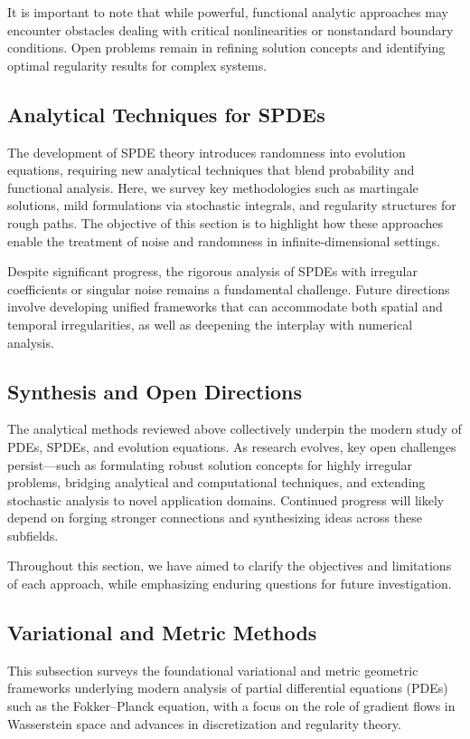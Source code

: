 \documentclass[sigconf]{acmart}
\begin{document}
It is important to note that while powerful, functional analytic approaches may encounter obstacles dealing with critical nonlinearities or nonstandard boundary conditions. Open problems remain in refining solution concepts and identifying optimal regularity results for complex systems.

\subsection{Analytical Techniques for SPDEs}
The development of SPDE theory introduces randomness into evolution equations, requiring new analytical techniques that blend probability and functional analysis. Here, we survey key methodologies such as martingale solutions, mild formulations via stochastic integrals, and regularity structures for rough paths. The objective of this section is to highlight how these approaches enable the treatment of noise and randomness in infinite-dimensional settings.

Despite significant progress, the rigorous analysis of SPDEs with irregular coefficients or singular noise remains a fundamental challenge. Future directions involve developing unified frameworks that can accommodate both spatial and temporal irregularities, as well as deepening the interplay with numerical analysis.

\subsection{Synthesis and Open Directions}
The analytical methods reviewed above collectively underpin the modern study of PDEs, SPDEs, and evolution equations. As research evolves, key open challenges persist—such as formulating robust solution concepts for highly irregular problems, bridging analytical and computational techniques, and extending stochastic analysis to novel application domains. Continued progress will likely depend on forging stronger connections and synthesizing ideas across these subfields.

Throughout this section, we have aimed to clarify the objectives and limitations of each approach, while emphasizing enduring questions for future investigation.

\subsection{Variational and Metric Methods}

This subsection surveys the foundational variational and metric geometric frameworks underlying modern analysis of partial differential equations (PDEs) such as the Fokker--Planck equation, with a focus on the role of gradient flows in Wasserstein space and advances in discretization and regularity theory.
\end{document}
